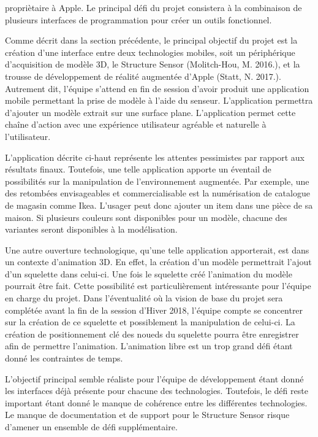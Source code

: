 \documentclass[letterpaper,twoside,12pt,french]{report}
\begin{document}
propriètaire à Apple. Le principal défi du projet consistera à la combinaison de plusieurs
interfaces de programmation pour créer un outils fonctionnel.
\par
Comme décrit dans la section précédente, le principal objectif du projet est la création d'une
interface entre deux technologies mobiles, soit un périphérique d'acquisition de modèle 3D, le Structure
Sensor (Molitch-Hou, M. 2016.), et la trousse de développement de réalité augmentée d'Apple
(Statt, N. 2017.). Autrement dit, l'équipe s'attend en fin de session d'avoir produit une application mobile
permettant la prise de modèle à l'aide du senseur. L'application permettra d'ajouter un modèle
extrait sur une surface plane. L'application permet cette chaîne d'action avec une expérience
utilisateur agréable et naturelle à l'utilisateur.
\par
L'application décrite ci-haut représente les attentes pessimistes par rapport aux résultats finaux.
Toutefois, une telle application apporte un éventail de possibilités sur la manipulation de
l'environnement augmentée. Par exemple, une des retombées envisageables et
commercialisable est la numérisation de catalogue de magasin comme Ikea. L'usager peut
donc ajouter un item dans une pièce de sa maison. Si plusieurs couleurs sont disponibles pour
un modèle, chacune des variantes seront disponibles à la modélisation.
\par
Une autre ouverture technologique, qu'une telle application apporterait, est dans un contexte
d'animation 3D. En effet, la création d'un modèle permettrait l'ajout d'un squelette dans celui-ci.
Une fois le squelette créé l'animation du modèle pourrait être fait. Cette possibilité est
particulièrement intéressante pour l'équipe en charge du projet. Dans l'éventualité où la vision
de base du projet sera complétée avant la fin de la session d'Hiver 2018, l'équipe compte se
concentrer sur la création de ce squelette et possiblement la manipulation de celui-ci. La création
de positionnement clé des noueds du squelette pourra être enregistrer afin de permettre l'animation.
L'animation libre est un trop grand défi étant donné les contraintes de temps.
\par
L'objectif principal semble réaliste pour l'équipe de développement étant donné les interfaces déjà
présente pour chacune des technologies. Toutefois, le défi reste important étant donné le manque de
cohérence entre les différentes technologies. Le manque de documentation et de support pour le
Structure Sensor risque d'amener un ensemble de défi supplémentaire.
\end{document}
